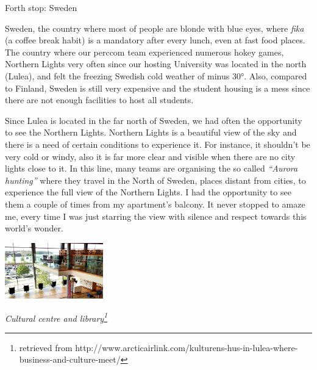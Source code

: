 \documentclass[10pt,a4paper]{article} %
\newcommand{\NewsItem}[1]{ %
\usefont{T1}{fvs}{n}{n} %
\vspace{24pt}\large #1\vspace{3pt} %
\par \normalsize \normalfont}
\begin{document}
\begin{multicols}{3}
\NewsItem{Forth stop: Sweden}

Sweden, the country where most of people are blonde with blue eyes, 
where \textit{fika} (a coffee break habit) is a mandatory after every lunch, 
even at fast food places. 
The country where our {\sc perccom} team experienced numerous hokey games, Northern 
Lights very often since our hosting University was located in the north (Lulea), and 
felt the freezing Swedish cold weather of minus \ang{30}. 
Also, compared to Finland, Sweden is still very expensive and the student housing is 
a mess since there are not enough facilities to host all students. 


Since Lulea is located in the far north of Sweden, we had often the opportunity to 
see the Northern Lights. 
Northern Lights is a beautiful view of the sky and there is a need of certain 
conditions to experience it. 
For instance, it shouldn't be very cold or windy, also it is far more clear and visible 
when there are no city lights close to it. 
In this line, many teams are organising the so called \textit{``Aurora hunting''} 
where they travel in the North of Sweden, places distant from cities, to experience 
the full view of the Northern Lights. 
I had the opportunity to see them a couple of times from my apartment's balcony. 
It never stopped to amaze me, every time I was just starring the view with silence 
and respect towards this world's wonder.



\begin{center}
	\includegraphics[width=0.32\textwidth]{media/cultural_centre_lulea.jpg}
	\par\textit{Cultural centre and library\footnote{retrieved from http://www.arcticairlink.com/kulturens-hus-in-lulea-where-business-and-culture-meet/}}
\end{center}


\end{multicols}
\end{document}
